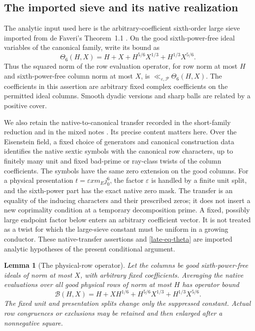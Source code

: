 \documentclass[11pt]{article}
\newtheorem{lemma}[theorem]{Lemma}
\theoremstyle{definition}
\newcommand{\eps}{\varepsilon}
\newcommand{\lls}{\ll_{\eps,\mathcal P}}
\begin{document}
\subsection{The imported sieve and its native realization}
\label{late-subsec-sieve}

The analytic input used here is the arbitrary-coefficient sixth-order
large sieve imported from de Faveri's Theorem~1.1 \cite{df}.  On the
good sixth-power-free ideal variables of the canonical family, write
its bound as
\begin{equation}
 \Theta_6(H,X)
 =H+X+H^{5/6}X^{1/3}+H^{1/3}X^{5/6}.
 \label{late-eq-theta}
\end{equation}
Thus the squared norm of the row evaluation operator, for row norm at
most $H$ and sixth-power-free column norm at most $X$, is
$\lls\Theta_6(H,X)$.  The coefficients in this assertion are arbitrary
fixed complex coefficients on the permitted ideal columns.  Smooth
dyadic versions and sharp balls are related by a positive cover.

We also retain the native-to-canonical transfer recorded in the
short-family reduction and in the mixed notes \cite{n6,n7}.  Its precise
content matters here.  Over the Eisenstein field, a fixed choice of
generators and canonical construction data identifies the native
sextic symbols with the canonical row characters, up to finitely many
unit and fixed bad-prime or ray-class twists of the column
coefficients.  The symbols have the same zero extension on the good
columns.  For a physical presentation
$t=\varepsilon x m_E j_0^6$, the factor $\varepsilon$ is handled by a
finite unit split, and the sixth-power part has the exact native zero
mask.  The transfer is an equality of the inducing characters and
their prescribed zeros; it does not insert a new coprimality condition
at a temporary decomposition prime.  A fixed, possibly large endpoint
factor below enters an arbitrary coefficient vector.  It is not
treated as a twist for which the large-sieve constant must be uniform
in a growing conductor.  These native-transfer assertions and
\eqref{late-eq-theta} are imported analytic hypotheses of the present
conditional argument.

\begin{lemma}[The physical-row operator]
\label{late-lem-physical}
Let the columns be good sixth-power-free ideals of norm at most $X$,
with arbitrary fixed coefficients.  Averaging the native evaluations
over all good physical rows of norm at most $H$ has operator bound
\begin{equation}
 \mathcal B(H,X)
 =H+XH^{1/6}+H^{5/6}X^{1/3}+H^{1/3}X^{5/6}.
 \label{late-eq-physical}
\end{equation}
The fixed unit and presentation splits change only the suppressed
constant.  Actual row congruences or exclusions may be retained and
then enlarged after a nonnegative square.
\end{lemma}
\end{document}
